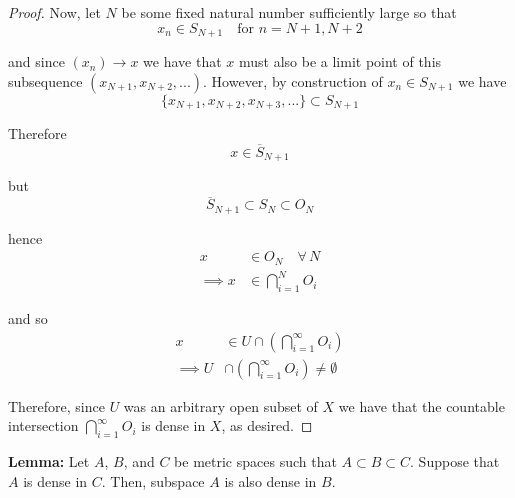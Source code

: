 \documentclass[12pt]{article}
\newlength\tindent
\renewcommand{\indent}{\hspace*{\tindent}}
\begin{document}
\begin{proof}
Now, let $N$ be some fixed natural number sufficiently large so that
\begin{equation*}
	x_n \in S_{N + 1} \quad \text{for } n = N + 1, N + 2
\end{equation*}

and since $(x_n) \to x$ we have that $x$ must also be a limit point of this subsequence $(x_{N + 1}, x_{N + 2},...)$. However, by construction of $x_n \in S_{N + 1}$ we have
\begin{equation*}
	\{ x_{N + 1}, x_{N + 2}, x_{N + 3}, ... \} \subset S_{N + 1}
\end{equation*}

Therefore
\begin{equation*}
	x \in \overline{S}_{N + 1}
\end{equation*}

but
\begin{equation*}
	\overline{S}_{N + 1} \subset S_N \subset O_N
\end{equation*}

hence
\begin{align*}
	x &\in O_N \quad \forall\,N \\
	\implies x &\in \bigcap^N_{i = 1} O_i
\end{align*}

and so 
\begin{align*}
	x &\in U \cap \left( \bigcap^\infty_{i = 1} O_i \right) \\
	\implies U &\cap \left( \bigcap^\infty_{i = 1} O_i \right) \neq \emptyset
\end{align*}

\indent Therefore, since $U$ was an arbitrary open subset of $X$ we have that the countable intersection $\bigcap^\infty_{i = 1} O_i$ is dense in $X$, as desired.
\end{proof}

%
%
{\bf Lemma:} Let $A$, $B$, and $C$ be metric spaces such that $A \subset B \subset C$. Suppose that $A$ is dense in $C$. Then, subspace $A$ is also dense in $B$.
\end{document}
